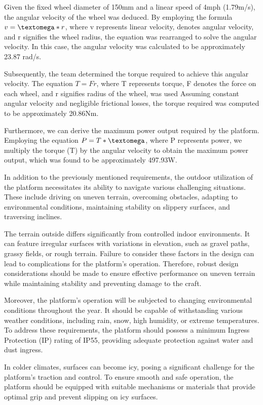 \documentclass [12pt]{article}
\begin{document}
Given the fixed wheel diameter of 150mm and a linear speed of 4mph (1.79m/s), the angular velocity of the wheel was deduced. By employing the formula $ v = \textomega * r $, where v represents linear velocity, \textomega denotes angular velocity, and r signifies the wheel radius, the equation was rearranged to solve the angular velocity. In this case, the angular velocity was calculated to be approximately 23.87 rad/s.

Subsequently, the team determined the torque required to achieve this angular velocity. The equation $T=Fr$, where T represents torque, F denotes the force on each wheel, and r signifies radius of the wheel, was used Assuming constant angular velocity \textomega and negligible frictional losses, the torque required was computed to be approximately 20.86Nm.

Furthermore, we can derive the maximum power output required by the platform. Employing the equation $ P = T* \textomega $, where P represents power, we multiply the torque (T) by the angular velocity \textomega to obtain the maximum power output, which was found to be approximately 497.93W.

In addition to the previously mentioned requirements, the outdoor utilization of the platform necessitates its ability to navigate various challenging situations. These include driving on uneven terrain, overcoming obstacles, adapting to environmental conditions, maintaining stability on slippery surfaces, and traversing inclines.

The terrain outside differs significantly from controlled indoor environments. It can feature irregular surfaces with variations in elevation, such as gravel paths, grassy fields, or rough terrain. Failure to consider these factors in the design can lead to complications for the platform's operation. Therefore, robust design considerations should be made to ensure effective performance on uneven terrain while maintaining stability and preventing damage to the craft.

Moreover, the platform's operation will be subjected to changing environmental conditions throughout the year. It should be capable of withstanding various weather conditions, including rain, snow, high humidity, or extreme temperatures. To address these requirements, the platform should possess a minimum Ingress Protection (IP) rating of IP55, providing adequate protection against water and dust ingress.

In colder climates, surfaces can become icy, posing a significant challenge for the platform's traction and control. To ensure smooth and safe operation, the platform should be equipped with suitable mechanisms or materials that provide optimal grip and prevent slipping on icy surfaces.
\end{document}
